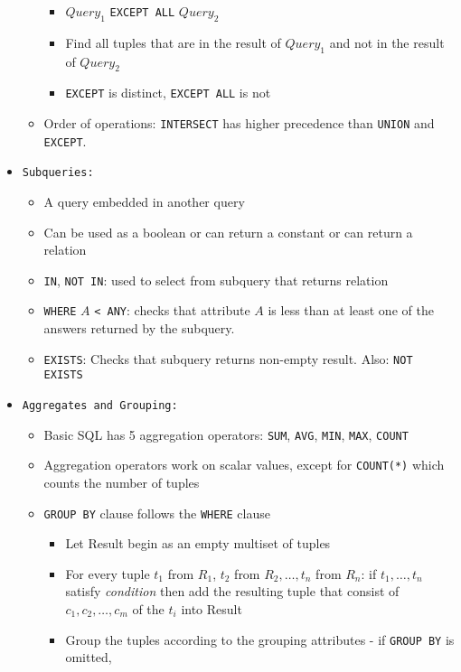\documentclass[landscape,8pt]{extarticle}
\newcommand{\code}{\lstinline}
\begin{document}
\begin{multicols}{4}
\begin{itemize}
\begin{itemize}
\begin{itemize}
            \item $Query_1$ \code{EXCEPT ALL} $Query_2$
            \item Find all tuples that are in the result of $Query_1$ and not in the result of $Query_2$
            \item \code{EXCEPT} is distinct, \code{EXCEPT ALL} is not
        \end{itemize}
        \item Order of operations: \code{INTERSECT} has higher precedence than \code{UNION} and \code{EXCEPT}.
    \end{itemize}
    \item \code{Subqueries:}
    \begin{itemize}
        \item A query embedded in another query
        \item Can be used as a boolean or can return a constant or can return a relation
        \item \code{IN}, \code{NOT IN}: used to select from subquery that returns relation
        \item \code{WHERE} $A$ \code{< ANY}: checks that attribute $A$ is less than at least one of
        the answers returned by the subquery.
        \item \code{EXISTS}: Checks that subquery returns non-empty result. Also: \code{NOT EXISTS}
    \end{itemize}
    \item \code{Aggregates and Grouping:}
    \begin{itemize}
    \item Basic SQL has 5 aggregation operators: \code{SUM}, \code{AVG}, \code{MIN}, \code{MAX}, \code{COUNT}
    \item Aggregation operators work on scalar values, except for \code{COUNT(*)} which counts the
    number of tuples
    \item \code{GROUP BY} clause follows the \code{WHERE} clause
    \begin{itemize}
        \item Let Result begin as an empty multiset of tuples
        \item For every tuple $t_1$ from $R_1$, $t_2$ from $R_2, \ldots, t_n$ from $R_n$: if $t_1,
        \ldots, t_n$ satisfy \emph{condition} then add the resulting tuple that consist of $c_1,
        c_2, \ldots, c_m$ of the $t_i$ into Result
        \item Group the tuples according to the grouping attributes - if \code{GROUP BY} is omitted,

\end{itemize}
\end{itemize}
\end{itemize}
\end{multicols}
\end{document}
